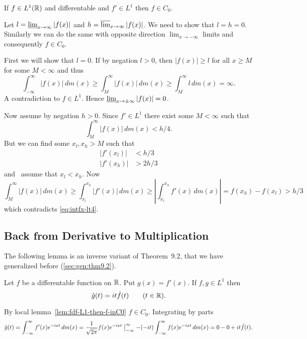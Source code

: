 \begin{llem} \label{lem:fdf-L1-then-f-inC0}
If \(f\in L^1(\mathbb{R})\)  and differentable and \(f'\in L^1\) then
\(f\in C_0\).
\end{llem}
\begin{thmproof}
Let 
\(l = \varliminf_{x\to\infty}|f(x)|\)
and
\(h = \varlimsup_{x\to\infty}|f(x)|\).
We need to show that \(l=h=0\).
Similarly we can do the same with 
opposite direction \(\lim_{x\to-\infty}\) limits 
and consequently \(f\in C_0\).

First we will show that \(l=0\). If by negation \(l>0\), 
then \(|f(x)|\geq l\) for all \(x\geq M\) for some \(M<\infty\)
and thus 
\begin{equation*}
\int_{-\infty}^\infty |f(x)|\,dm(x)
\geq \int_M^\infty|f(x)|\,dm(x) 
\geq \int_M^\infty l\,dm(x) = \infty.
\end{equation*}
A contradiction to \(f\in L^1\). 
Hence \(\varliminf_{x\to\pm\infty}|f(x)| = 0\).

Now assume by negation \(h>0\).
Since \(f'\in L^1\) there exist some \(M<\infty\) such that
\begin{equation} \label{eq:intfx-lt4}
\int_M^\infty |f(x)|\,dm(x) < h/4.
\end{equation}
But we can find some \(x_l,x_h>M\) such that
\begin{align*}
|f'(x_l)| &< h/3 \\
|f'(x_h)| &> 2h/3
\end{align*}
and \wlogy\ assume that \(x_l < x_h\). Now
\begin{equation*}
\int_M^\infty |f(x)|\,dm(x) 
\geq \int_{x_l}^{x_h} |f'(x)|\,dm(x) 
\geq \left|\int_{x_l}^{x_h} f'(x)\,dm(x)\right|
= f(x_h) - f(x_l)
> h/3
\end{equation*}
which contradicts \eqref{eq:intfx-lt4}.
\end{thmproof}

\subsection{Back from Derivative to Multiplication}

The following lemma is an inverse variant of Theorem~9.2,
that we have generalized before (\ref{sec:gen:thm9.2}).
\begin{llem} \label{lem:fourierdif}
Let $f$ be a differentable function on \(\mathbb{R}\).
Put \(g(x)=f'(x)\).
If \(f,g\in L^1\) then
\begin{equation} \label{eq:fourierdif}
\hat{g}(t) = it\hat{f}(t) \qquad (t\in\mathbb{R}).
\end{equation}
\end{llem}
\begin{thmproof}
By local lemma~\ref{lem:fdf-L1-then-f-inC0} \(f\in C_0\).
Integrating by parts
\begin{equation*}
\hat{g}(t) 
= \int_{-\infty}^\infty f'(x)e^{-ixt}\,dm(x)
= \frac{1}{\sqrt{2\pi}}f(x)e^{-ixt}\bigm|_{-\infty}^\infty 
  - (-it)\int_{-\infty}^\infty f(x)e^{-ixt}\,dm(x)
= 0 - 0 + it\hat{f}(t).
\end{equation*}
\end{thmproof}

